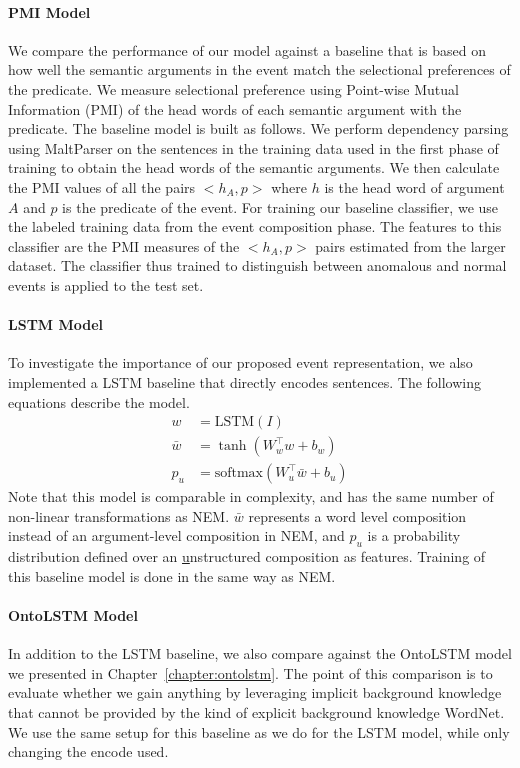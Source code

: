 \paragraph{PMI Model} We compare the performance of our model against a baseline that is based
on how well the semantic arguments in the event match the selectional preferences 
of the predicate.  We measure selectional preference using Point-wise Mutual Information
(PMI) \citep{church1990word} of the head words of each semantic argument with the predicate.  
The baseline model is built as follows.  We perform dependency parsing using MaltParser
\citep{nivre2007maltparser} on the sentences in the training data used in the first phase of training to
obtain the head words of the semantic arguments.  We then calculate the PMI values of all the pairs
$<h_A, p>$ where $h$ is the head word of argument $A$ and $p$ is the predicate of the event.  
For training our baseline classifier, we use the labeled training data from the event composition phase.
The features to this classifier are the PMI measures of the $<h_A, p>$ pairs estimated from the larger
dataset.  The classifier thus trained to distinguish between anomalous and normal events is applied to the test set.

\paragraph{LSTM Model} To investigate the importance of our proposed event representation, we also implemented a LSTM baseline that
directly encodes sentences. The following equations describe the model.
\begin{align}
 w &= \text{LSTM}(I) \\
 \bar{w} &= \tanh(W_w^\intercal w + b_w) \\
 p_u &= \text{softmax}(W_u^\intercal \bar{w} + b_u)
\end{align}
Note that this model is comparable in complexity, and has the same number of non-linear transformations as NEM\@. $\bar{w}$ represents a
word level composition instead of an argument-level composition in NEM, and $p_u$ is a probability distribution defined over an
\underline{u}nstructured composition as features. Training of this baseline model is done in the same way as NEM\@.

\paragraph{OntoLSTM Model} In addition to the LSTM baseline, we also compare
against the OntoLSTM model we presented in Chapter~\ref{chapter:ontolstm}. The
point of this comparison is to evaluate whether we gain anything by leveraging
implicit background knowledge that cannot be provided by the kind of explicit
background knowledge WordNet. We use the same setup for this baseline as we do
for the LSTM model, while only changing the encode used.

